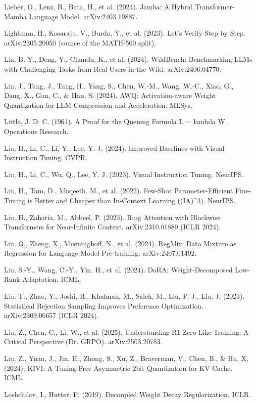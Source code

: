 {\begin{enumerate}[leftmargin=*,itemsep=1pt,label={[\arabic*]}]
\item Lieber, O., Lenz, B., Bata, H., et al. (2024). Jamba: A Hybrid Transformer-Mamba Language Model. arXiv:2403.19887.
\item Lightman, H., Kosaraju, V., Burda, Y., et al. (2023). Let's Verify Step by Step. arXiv:2305.20050 (source of the MATH-500 split).
\item Lin, B. Y., Deng, Y., Chandu, K., et al. (2024). WildBench: Benchmarking LLMs with Challenging Tasks from Real Users in the Wild. arXiv:2406.04770.
\item Lin, J., Tang, J., Tang, H., Yang, S., Chen, W.-M., Wang, W.-C., Xiao, G., Dang, X., Gan, C., \& Han, S. (2024). AWQ: Activation-aware Weight Quantization for LLM Compression and Acceleration. MLSys.
\item Little, J. D. C. (1961). A Proof for the Queuing Formula L = lambda W. Operations Research.
\item Liu, H., Li, C., Li, Y., Lee, Y. J. (2024). Improved Baselines with Visual Instruction Tuning. CVPR.
\item Liu, H., Li, C., Wu, Q., Lee, Y. J. (2023). Visual Instruction Tuning. NeurIPS.
\item Liu, H., Tam, D., Muqeeth, M., et al. (2022). Few-Shot Parameter-Efficient Fine-Tuning is Better and Cheaper than In-Context Learning ((IA)\textasciicircum{}3). NeurIPS.
\item Liu, H., Zaharia, M., Abbeel, P. (2023). Ring Attention with Blockwise Transformers for Near-Infinite Context. arXiv:2310.01889 (ICLR 2024).
\item Liu, Q., Zheng, X., Muennighoff, N., et al. (2024). RegMix: Data Mixture as Regression for Language Model Pre-training. arXiv:2407.01492.
\item Liu, S.-Y., Wang, C.-Y., Yin, H., et al. (2024). DoRA: Weight-Decomposed Low-Rank Adaptation. ICML.
\item Liu, T., Zhao, Y., Joshi, R., Khalman, M., Saleh, M., Liu, P. J., Liu, J. (2023). Statistical Rejection Sampling Improves Preference Optimization. arXiv:2309.06657 (ICLR 2024).
\item Liu, Z., Chen, C., Li, W., et al. (2025). Understanding R1-Zero-Like Training: A Critical Perspective (Dr. GRPO). arXiv:2503.20783.
\item Liu, Z., Yuan, J., Jin, H., Zhong, S., Xu, Z., Braverman, V., Chen, B., \& Hu, X. (2024). KIVI: A Tuning-Free Asymmetric 2bit Quantization for KV Cache. ICML.
\item Loshchilov, I., Hutter, F. (2019). Decoupled Weight Decay Regularization. ICLR.

\end{enumerate}}
